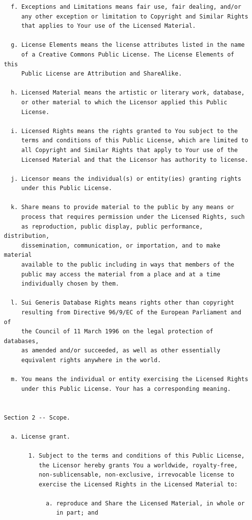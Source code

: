 \documentclass[12pt,spanish,]{scrartcl}
\begin{document}
\begin{verbatim}
  f. Exceptions and Limitations means fair use, fair dealing, and/or
     any other exception or limitation to Copyright and Similar Rights
     that applies to Your use of the Licensed Material.

  g. License Elements means the license attributes listed in the name
     of a Creative Commons Public License. The License Elements of this
     Public License are Attribution and ShareAlike.

  h. Licensed Material means the artistic or literary work, database,
     or other material to which the Licensor applied this Public
     License.

  i. Licensed Rights means the rights granted to You subject to the
     terms and conditions of this Public License, which are limited to
     all Copyright and Similar Rights that apply to Your use of the
     Licensed Material and that the Licensor has authority to license.

  j. Licensor means the individual(s) or entity(ies) granting rights
     under this Public License.

  k. Share means to provide material to the public by any means or
     process that requires permission under the Licensed Rights, such
     as reproduction, public display, public performance, distribution,
     dissemination, communication, or importation, and to make material
     available to the public including in ways that members of the
     public may access the material from a place and at a time
     individually chosen by them.

  l. Sui Generis Database Rights means rights other than copyright
     resulting from Directive 96/9/EC of the European Parliament and of
     the Council of 11 March 1996 on the legal protection of databases,
     as amended and/or succeeded, as well as other essentially
     equivalent rights anywhere in the world.

  m. You means the individual or entity exercising the Licensed Rights
     under this Public License. Your has a corresponding meaning.


Section 2 -- Scope.

  a. License grant.

       1. Subject to the terms and conditions of this Public License,
          the Licensor hereby grants You a worldwide, royalty-free,
          non-sublicensable, non-exclusive, irrevocable license to
          exercise the Licensed Rights in the Licensed Material to:

            a. reproduce and Share the Licensed Material, in whole or
               in part; and


\end{verbatim}
\end{document}

